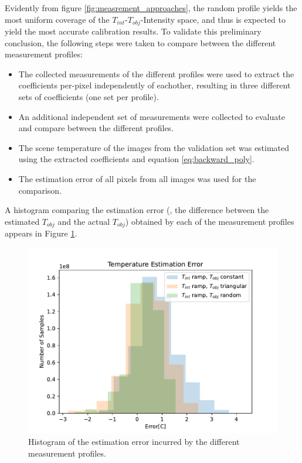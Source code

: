 Evidently from figure \ref{fig:measrement_approaches}, the random profile yields the most uniform coverage of the $T_\mathit{int}$-$T_\mathit{obj}$-Intensity space, and thus is expected to yield the most accurate calibration results.
To validate this preliminary conclusion, the following steps were taken to compare between the different measurement profiles:  
\begin{itemize}
  \item The collected measurements of the different profiles were used to extract the coefficients per-pixel independently of eachother, resulting in three different sets of coefficients (one set per profile).
  \item An additional independent set of measurements were collected to evaluate and compare between the different profiles.
  \item The scene temperature of the images from the validation set was estimated using the extracted coefficients and equation \ref{eq:backward_poly}.
  \item The estimation error of all pixels from all images was used for the comparison.
\end{itemize} 
A histogram comparing the estimation error (\ie, the difference between the estimated $T_\mathit{obj}$ and the actual $T_\mathit{obj}$) obtained by each of the measurement profiles appears in Figure \ref{fig:profiles_error_comp}.
\begin{figure}[H]
  \centering
  \includegraphics[width=\linewidth]{../figs/methods/profiles_error_comp.pdf}
  \caption{Histogram of the estimation error incurred by the different measurement profiles.}
  \label{fig:profiles_error_comp}
\end{figure}

